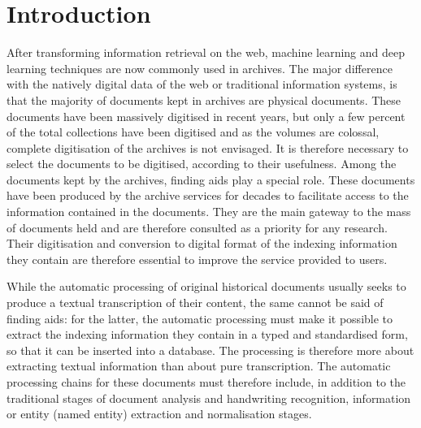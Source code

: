 \documentclass[runningheads]{llncs}
\begin{document}
\section{Introduction}
After transforming information retrieval on the web, machine learning and deep learning techniques are now commonly used in archives\cite{Colavizza2021}. The major difference with the natively digital data of the web or traditional information systems, is that the majority of documents kept in archives are physical documents. These documents have been massively digitised in recent years, but only a few percent of the total collections have been digitised and as the volumes are colossal, complete digitisation of the archives is not envisaged. It is therefore necessary to select the documents to be digitised, according to their usefulness. Among the documents kept by the archives, finding aids play a special role. These documents have been produced by the archive services for decades to facilitate access to the information contained in the documents. They are the main gateway to the mass of documents held and are therefore consulted as a priority for any research. Their digitisation and conversion to digital format of the indexing information they contain are therefore essential to improve the service provided to users.

While the automatic processing of original historical documents usually seeks to produce a textual transcription of their content\cite{muehlberger2019}, the same cannot be said of finding aids: for the latter, the automatic processing must make it possible to extract the indexing information they contain in a typed and standardised form, so that it can be inserted into a database. The processing is therefore more about extracting textual information than about pure transcription. The automatic processing chains for these documents must therefore include, in addition to the traditional stages of document analysis and handwriting recognition, information or entity (named entity) extraction \cite{Cunhal2022} and normalisation stages. 
\end{document}
